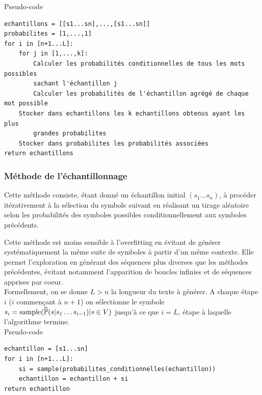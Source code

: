 \noindent{} Pseudo-code
\begin{verbatim}
echantillons = [[s1...sn],...,[s1...sn]]
probabilites = [1,...,1]
for i in [n+1...L]:
    for j in [1,...,k]:
        Calculer les probabilités conditionnelles de tous les mots possibles
        sachant l'échantillon j
        Calculer les probabilités de l'échantillon agrégé de chaque mot possible
    Stocker dans echantillons les k echantillons obtenus ayant les plus
        grandes probabilites
    Stocker dans probabilites les probabilités associées
return echantillons
\end{verbatim}

\subsubsection{Méthode de l'échantillonnage}

Cette méthode consiste, étant donné un échantillon initial $(s_1\ldots s_n)$, à procéder itérativement à la sélection du symbole suivant en réalisant un tirage aléatoire selon les probabilités des symboles possibles conditionnellement aux symboles précédents.

Cette méthode est moins sensible à l'overfitting en évitant de générer systématiquement la même suite de symboles à partir d'un même contexte. Elle permet l'exploration en générant des séquences plus diverses que les méthodes précédentes, évitant notamment l'apparition de boucles infinies et de séquences apprises par coeur. \\

Formellement, on se donne $L>n$ la longueur du texte à générer.
A chaque étape $i$ ($i$ commençant à $n+1$) on sélectionne le symbole $s_i = \text{sample}({\widehat{\P}(s|s_1\ldots s_{i-1}) | s \in V})$ jusqu'à ce que $i=L$, étape à laquelle l'algorithme termine. \\

\noindent{} Pseudo-code

\begin{verbatim}
echantillon = [s1...sn]
for i in [n+1...L]:
    si = sample(probabilites_conditionnelles(echantillon))
    echantillon = echantillon + si
return echantillon
\end{verbatim}



